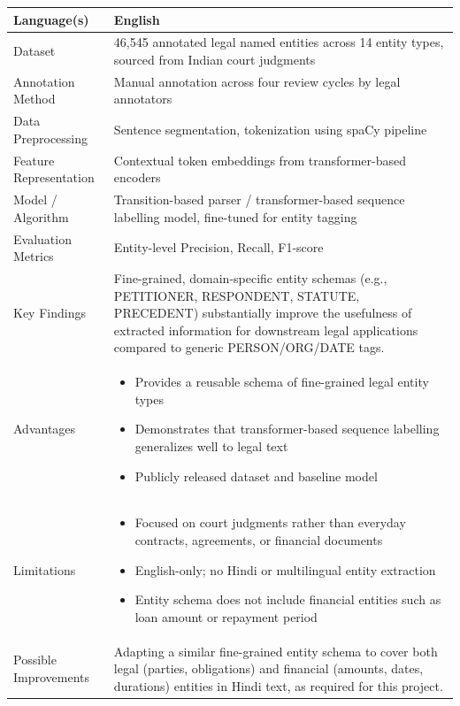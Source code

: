 \begin{longtable}{|p{5cm}|p{10cm}|}
Language(s) &
English
\\ \hline

Dataset &
46,545 annotated legal named entities across 14 entity types, sourced from Indian court judgments
\\ \hline

Annotation Method &
Manual annotation across four review cycles by legal annotators
\\ \hline

Data Preprocessing &
Sentence segmentation, tokenization using spaCy pipeline
\\ \hline

Feature Representation &
Contextual token embeddings from transformer-based encoders
\\ \hline

Model / Algorithm &
Transition-based parser / transformer-based sequence labelling model, fine-tuned for entity tagging
\\ \hline

Evaluation Metrics &
Entity-level Precision, Recall, F1-score
\\ \hline

Key Findings &
Fine-grained, domain-specific entity schemas (e.g., PETITIONER, RESPONDENT, STATUTE, PRECEDENT) substantially improve the usefulness of extracted information for downstream legal applications compared to generic PERSON/ORG/DATE tags.
\\ \hline

Advantages &
\begin{itemize}
\item Provides a reusable schema of fine-grained legal entity types
\item Demonstrates that transformer-based sequence labelling generalizes well to legal text
\item Publicly released dataset and baseline model
\end{itemize}
\\ \hline

Limitations &
\begin{itemize}
\item Focused on court judgments rather than everyday contracts, agreements, or financial documents
\item English-only; no Hindi or multilingual entity extraction
\item Entity schema does not include financial entities such as loan amount or repayment period
\end{itemize}
\\ \hline

Possible Improvements &
Adapting a similar fine-grained entity schema to cover both legal (parties, obligations) and financial (amounts, dates, durations) entities in Hindi text, as required for this project.
\\ \hline

\end{longtable}

